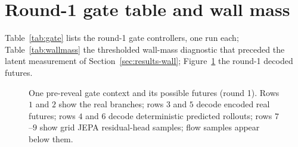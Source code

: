 \begin{table}[ht]
\centering
\caption{Audit of the off-budget heads on the grid JEPA latent: what they read on the $25{,}000$ real
evaluation transitions split by the cause of death, what the model's own eight-step rollouts from
$512$ real contexts return under the dataset's actions, and what the heads-MPC planner sees at horizon
$3$: the mean over its $64$ candidate plans against the best plan it picks.}
\label{tab:heads}
\vspace{0.2em}
\end{table}

\section{Round-1 gate table and wall mass}
\label{app:round1tables}

Table~\ref{tab:gate} lists the round-1 gate controllers, one run each; Table~\ref{tab:wallmass} the
thresholded wall-mass diagnostic that preceded the latent measurement of
Section~\ref{sec:results-wall}; Figure~\ref{fig:predictions} the round-1 decoded futures.

\begin{table}[ht]
\centering
\caption{Round-1 gate results with $128$ planning episodes and $256$ policy episodes; the planning
harness's random reference passes $0.09$ walls with mean length $32.2$.}
\label{tab:gate}
\vspace{0.2em}
\end{table}

\begin{table}[ht]
\centering
\caption{Decoded wall mass in the round-1 gate diagnostics: a pixel counts as wall when every channel
exceeds $200/255$; encoding a real future and rolling out a predictor test different parts of the
model.}
\label{tab:wallmass}
\vspace{0.2em}
\end{table}

\begin{figure}[ht]
\centering
{}
\caption{One pre-reveal gate context and its possible futures (round 1). Rows $1$ and $2$ show the
real branches; rows $3$ and $5$ decode encoded real futures; rows $4$ and $6$ decode deterministic
predicted rollouts; rows $7$--$9$ show grid JEPA residual-head samples; flow samples appear below
them.}
\label{fig:predictions}
\end{figure}

